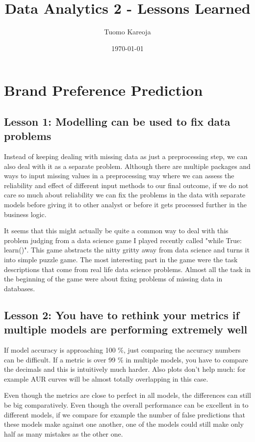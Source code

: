 \documentclass[12pt,a4paper,leqno]{report}
\title{Data Analytics 2 - Lessons Learned}
\author{Tuomo Kareoja}
\date{\today}
\theoremstyle{plain}
\theoremstyle{definition}
\theoremstyle{remark}
\begin{document}
\maketitle

\newpage

\section{Brand Preference Prediction}

\subsection{Lesson 1: Modelling can be used to fix data problems}

Instead of keeping dealing with missing data as just a preprocessing step, we can also
deal with it as a separate problem. Although there are multiple packages and ways
to input missing values in a preprocessing way where we can assess the reliability
and effect of different input methods to our final outcome, if we do not care so much
about reliability we can fix the problems in the data with separate models before
giving it to other analyst or before it gets processed further in the business logic.

It seems that this might actually be quite a common way to deal with this problem
judging from a data science game I played recently called "while True: learn()".
This game abstracts the nitty gritty away from data science and turns it into
simple puzzle game. The most interesting part in the game were the task descriptions
that come from real life data science problems. Almost all the task in the beginning
of the game were about fixing problems of missing data in databases.

\subsection{Lesson 2: You have to rethink your metrics if multiple models are performing extremely well}

If model accuracy is approaching 100 \%, just comparing the accuracy numbers can be difficult.
If a metric is over 99 \% in multiple models, you have to compare the decimals and
this is intuitively much harder. Also plots don't help much: for example AUR curves will
be almost totally overlapping in this case.

Even though the metrics are close to perfect in all models, the differences can still be
big comparatively. Even though the overall performance can be excellent in to different models, if we compare for
example the number of false predictions that these models make against one another, one of the models
could still make only half as many mistakes as the other one.
\end{document}
